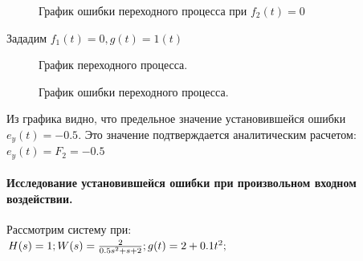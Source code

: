 \documentclass[a4paper, 11pt]{article}
\begin{document}
\begin{figure}[h!]
    \caption{График ошибки переходного процесса при $f_2(t) = 0$}
    \label{tree}
\end{figure}

\newpage

Зададим $f_1(t) = 0, g(t) = 1(t)$

\begin{figure}[h]
    \caption{График переходного процесса.}
    \label{two}
\end{figure}
    
\begin{figure}[h]
    \caption{График ошибки переходного процесса.}
    \label{tree}
\end{figure}

Из графика видно, что предельное значение установившейся ошибки $e_y(t)=-0.5$. Это значение подтверждается аналитическим расчетом:
$e_y(t)=F_2=-0.5$
\newpage
\paragraph{Исследование установившейся ошибки при произвольном входном воздействии.} Рассмотрим систему при:\\
$H(s)=1; \\\\ 
W(s)=\frac {2} {0.5s^2+s+2}; \\\\  
g(t)=2+0.1t^2;$
\end{document}
